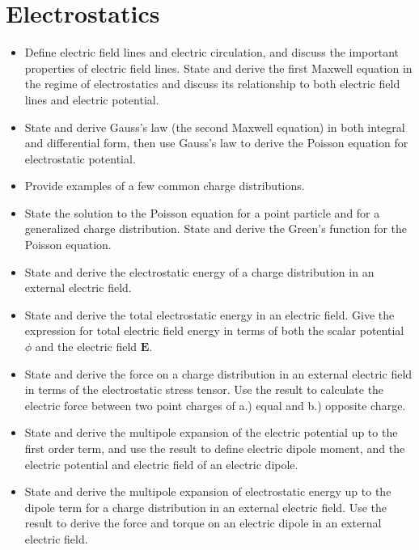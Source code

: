 



\section{Electrostatics}

\begin{itemize}

    \item Define electric field lines and electric circulation, and discuss the important properties of electric field lines. State and derive the first Maxwell equation in the regime of electrostatics and discuss its relationship to both electric field lines and electric potential.

    \item State and derive Gauss's law (the second Maxwell equation) in both integral and differential form, then use Gauss's law to derive the Poisson equation for electrostatic potential.

    \item Provide examples of a few common charge distributions.

    \item State the solution to the Poisson equation for a point particle and for a generalized charge distribution. State and derive the Green's function for the Poisson equation.

    \item State and derive the electrostatic energy of a charge distribution in an external electric field.

    \item State and derive the total electrostatic energy in an electric field. Give the expression for total electric field energy in terms of both the scalar potential $ \phi $ and the electric field $ \bm{E} $.

    \item State and derive the force on a charge distribution in an external electric field in terms of the electrostatic stress tensor. Use the result to calculate the electric force between two point charges of a.) equal and b.) opposite charge.

    \item State and derive the multipole expansion of the electric potential up to the first order term, and use the result to define electric dipole moment, and the electric potential and electric field of an electric dipole.

    \item State and derive the multipole expansion of electrostatic energy up to the dipole term for a charge distribution in an external electric field. Use the result to derive the force and torque on an electric dipole in an external electric field.

\end{itemize}

